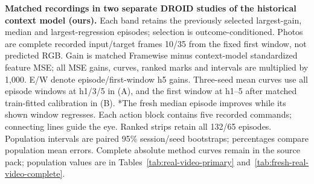 \textbf{Matched recordings in two separate DROID studies of the historical context model (ours).} Each band retains the previously selected largest-gain, median and largest-regression episodes; selection is outcome-conditioned. Photos are complete recorded input/target frames 10/35 from the fixed first window, not predicted RGB. Gain is matched Framewise minus context-model standardized feature MSE; all MSE gains, curves, ranked marks and intervals are multiplied by 1,000. E/W denote episode/first-window h5 gains. Three-seed mean curves use all episode windows at h1/3/5 in (A), and the first window at h1--5 after matched train-fitted calibration in (B). *The fresh median episode improves while its shown window regresses. Each action block contains five recorded commands; connecting lines guide the eye. Ranked strips retain all 132/65 episodes. Population intervals are paired 95\% session/seed bootstraps; percentages compare population mean errors. Complete absolute method curves remain in the source pack; population values are in Tables~\ref{tab:real-video-primary} and~\ref{tab:fresh-real-video-complete}.
